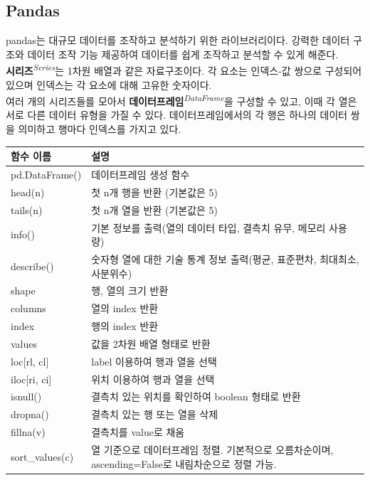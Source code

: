\subsection{Pandas}

pandas는 대규모 데이터를 조작하고 분석하기 위한 라이브러리이다. 강력한 데이터 구조와 데이터 조작 기능 제공하여 데이터를 쉽게 조작하고 분석할 수 있게 해준다.\\
\textbf{시리즈}\textit{\textsuperscript{Series}}는 1차원 배열과 같은 자료구조이다. 각 요소는 인덱스-값 쌍으로 구성되어 있으며 인덱스는 각 요소에 대해 고유한 숫자이다.\\
여러 개의 시리즈들를 모아서 \textbf{
데이터프레임}\textit{\textsuperscript{DataFrame}}을 구성할 수 있고, 이때 각 열은 서로 다른 데이터 유형을 가질 수 있다. 데이터프레임에서의 각 행은 하나의 데이터 쌍을 의미하고 행마다 인덱스를 가지고 있다.

\begin{longtable}{p{4cm}p{10cm}}
\toprule
함수 이름 & 설명\\
\midrule
pd.DataFrame() & 데이터프레임 생성 함수\\
head(n) & 첫 n개 행을 반환 (기본값은 5) \\
tails(n) & 첫 n개 열을 반환 (기본값은 5) \\
info() & 기본 정보를 출력(열의 데이터 타입, 결측치 유무, 메모리 사용량) \\
describe() & 숫자형 열에 대한 기술 통계 정보 출력(평균, 표준편차, 최대최소, 사분위수) \\
shape & 행, 열의 크기 반환 \\
columns & 열의 index 반환 \\
index & 행의 index 반환 \\
values & 값을 2차원 배열 형태로 반환 \\
loc{[}rl, cl{]} & label 이용하여 행과 열을 선택 \\
iloc{[}ri, ci{]} & 위치 이용하여 행과 열을 선택 \\
isnull() & 결측치 있는 위치를 확인하여 boolean 형태로 반환 \\
dropna() & 결측치 있는 행 또는 열을 삭제 \\
fillna(v) & 결측치를 value로 채움 \\
sort\_values(c) & 열 기준으로 데이터프레임 정렬. 기본적으로 오름차순이며, ascending=False로 내림차순으로 정렬 가능. \\
\bottomrule
\end{longtable}
